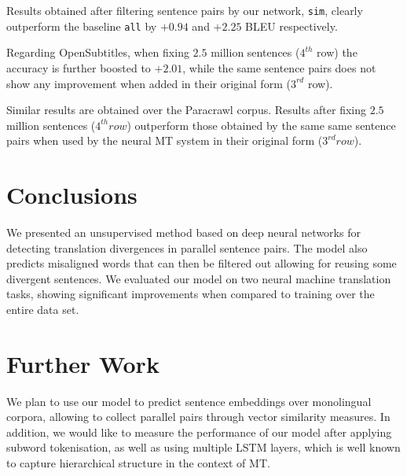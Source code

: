 \documentclass[11pt,a4paper]{article}
\begin{document}
Results obtained after filtering sentence pairs by our network, \texttt{sim}, clearly outperform the baseline \texttt{all} by $+0.94$ and $+2.25$ BLEU respectively.

Regarding OpenSubtitles, when fixing $2.5$ million sentences ($4^{th}$ row) the accuracy is further boosted to $+2.01$, while the same sentence pairs does not show any improvement when added in their original form ($3^{rd}$ row).

Similar results are obtained over the Paracrawl corpus. Results after fixing $2.5$ million sentences ($4^{th} row$) outperform those obtained by the same same sentence pairs when used by the neural MT system in their original form ($3^{rd} row$).

\section{Conclusions}
\label{conclusions}

We presented an unsupervised method based on deep neural networks for detecting translation divergences in parallel sentence pairs. 
The model also predicts misaligned words that can then be filtered out allowing for reusing some divergent sentences. 
We evaluated our model on two neural machine translation tasks, showing significant improvements when compared to training over the entire data set. 

\section{Further Work}
\label{further}

We plan to use our model to predict sentence embeddings over monolingual corpora, allowing to collect parallel pairs through vector similarity measures.
In addition, we would like to measure the performance of our model after applying subword tokenisation,
as well as using multiple LSTM layers, which is well known to capture hierarchical structure in the context of MT.





\end{document}
